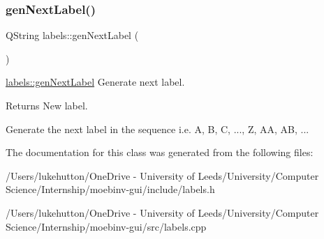 \subsubsection{\texorpdfstring{gen\+Next\+Label()}{genNextLabel()}}
{\footnotesize\ttfamily Q\+String labels\+::gen\+Next\+Label (\begin{DoxyParamCaption}{ }\end{DoxyParamCaption})}



\mbox{\hyperlink{classlabels_a70a7436dbef91e342fec4ec3130187e2}{labels\+::gen\+Next\+Label}} Generate next label. 

\begin{DoxyReturn}{Returns}
New label.
\end{DoxyReturn}
Generate the next label in the sequence i.\+e. A, B, C, ..., Z, AA, AB, ... 

The documentation for this class was generated from the following files\+:\begin{DoxyCompactItemize}
\item 
/\+Users/lukehutton/\+One\+Drive -\/ University of Leeds/\+University/\+Computer Science/\+Internship/moebinv-\/gui/include/labels.\+h\item 
/\+Users/lukehutton/\+One\+Drive -\/ University of Leeds/\+University/\+Computer Science/\+Internship/moebinv-\/gui/src/labels.\+cpp\end{DoxyCompactItemize}
